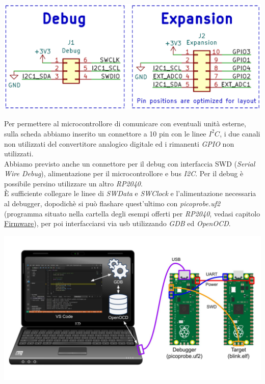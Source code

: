 \begin{center}
\includegraphics[scale=0.2]{figures/image90.png}
\captionsetup{type=figure}
\end{center}

\noindent Per permettere al microcontrollore di comunicare con eventuali unità
esterne, sulla scheda abbiamo inserito un connettore a 10 pin con le
linee \emph{$I^2C$}, i due canali non utilizzati del convertitore analogico
digitale ed i rimanenti \emph{GPIO} non utilizzati.\\
Abbiamo previsto anche un connettore per il debug con interfaccia SWD
(\emph{Serial Wire Debug}), alimentazione per il microcontrollore e bus
\emph{I2C}. Per il debug è possibile persino utilizzare un altro \emph{RP2040}.\\
È sufficiente collegare le linee di \emph{SWData} e
\emph{SWClock} e l'alimentazione necessaria al debugger,
dopodichè si può flashare quest'ultimo con \emph{picoprobe.uf2}
(programma situato nella cartella degli esempi offerti per \emph{RP2040},
vedasi capitolo
\protect\hyperlink{_w8kvxnysumpc}{\underline{Firmware}}), per poi
interfacciarsi via usb utilizzando \emph{GDB} ed \emph{OpenOCD}.

\begin{center}
\includegraphics[scale=0.2]{figures/image18.png}
\captionsetup{type=figure}
\end{center}

